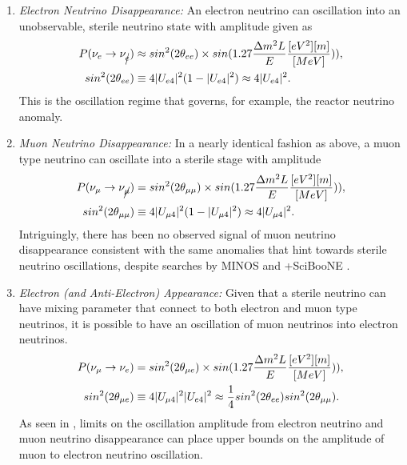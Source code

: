 \begin{enumerate}
  \item{ \em Electron Neutrino Disappearance:} An electron neutrino can oscillation into an unobservable, sterile neutrino state with amplitude given as
  \begin{align}
  P(\nu_{e} \rightarrow \nu_{\cancel{e}}) &\approx sin^2(2 \theta_{ee})\times sin(1.27 \frac{\Delta m^2 L}{E} \frac{[eV^2][m]}{[MeV]})),
   \\
  sin^2(2 \theta_{ee}) &\equiv 4 |U_{e4}|^2 (1 - |U_{e4}|^2) \approx 4 |U_{e4}|^2.
  \end{align}
  This is the oscillation regime that governs, for example, the reactor neutrino anomaly.
  \item { \em Muon Neutrino Disappearance: } In a nearly identical fashion as above, a muon type neutrino can oscillate into a sterile stage with amplitude 
  \begin{align}
  P(\nu_{\mu} \rightarrow \nu_{\cancel{\mu}}) &= sin^2(2 \theta_{\mu\mu})\times sin(1.27 \frac{\Delta m^2 L}{E} \frac{[eV^2][m]}{[MeV]})),
   \\
  sin^2(2 \theta_{\mu\mu}) &\equiv 4 |U_{\mu4}|^2 (1 - |U_{\mu4}|^2) \approx 4 |U_{\mu 4}|^2.
  \end{align}
  Intriguingly, there has been no observed signal of muon neutrino disappearance consistent with the same anomalies that hint towards sterile neutrino oscillations, despite searches by MINOS \cite{minos} and \MB+SciBooNE \cite{miniboone_sciboone}.

  \item { \em Electron (and Anti-Electron) Appearance:} Given that a sterile neutrino can have mixing parameter that connect to both electron and muon type neutrinos, it is possible to have an oscillation of muon neutrinos into electron neutrinos.
  \begin{align}
  P(\nu_{\mu} \rightarrow \nu_{e}) &= sin^2(2 \theta_{\mu e})\times sin(1.27 \frac{\Delta m^2 L}{E} \frac{[eV^2][m]}{[MeV]})),
   \\
  sin^2(2 \theta_{\mu e}) &\equiv 4 |U_{\mu4}|^2|U_{e4}|^2 \approx \frac{1}{4} sin^2(2 \theta_{ee}) sin^2(2 \theta_{\mu \mu}).
  \end{align}
  As seen in \cite{giunti_constraint,other_constraint}, limits on the oscillation amplitude from electron neutrino and muon neutrino disappearance can place upper bounds on the amplitude of muon to electron neutrino oscillation.
\end{enumerate}

